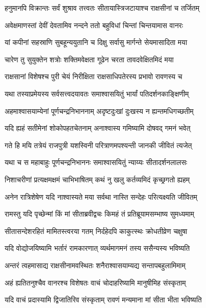 
\twolineshloka
{हनुमानपि विक्रान्तः सर्वं शुश्राव तत्त्वतः}
{सीतायास्त्रिजटायाश्च राक्षसीनां च तर्जितम्} %

\twolineshloka
{अवेक्षमाणस्तां देवीं देवतामिव नन्दने}
{ततो बहुविधां चिन्तां चिन्तयामास वानरः} %

\twolineshloka
{यां कपीनां सहस्राणि सुबहून्ययुतानि च}
{दिक्षु सर्वासु मार्गन्ते सेयमासादिता मया} %

\twolineshloka
{चारेण तु सुयुक्तेन शत्रोः शक्तिमवेक्षता}
{गूढेन चरता तावदवेक्षितमिदं मया} %

\twolineshloka
{राक्षसानां विशेषश्च पुरी चेयं निरीक्षिता}
{राक्षसाधिपतेरस्य प्रभावो रावणस्य च} %

\twolineshloka
{यथा तस्याप्रमेयस्य सर्वसत्त्वदयावतः}
{समाश्वासयितुं भार्यां पतिदर्शनकाङ्क्षिणीम्} %

\twolineshloka
{अहमाश्वासयाम्येनां पूर्णचन्द्रनिभाननाम्}
{अदृष्टदुःखां दुःखस्य न ह्यन्तमधिगच्छतीम्} %

\twolineshloka
{यदि ह्यहं सतीमेनां शोकोपहतचेतनाम्}
{अनाश्वास्य गमिष्यामि दोषवद् गमनं भवेत्} %

\twolineshloka
{गते हि मयि तत्रेयं राजपुत्री यशस्विनी}
{परित्राणमपश्यन्ती जानकी जीवितं त्यजेत्} %

\twolineshloka
{यथा च स महाबाहुः पूर्णचन्द्रनिभाननः}
{समाश्वासयितुं न्याय्यः सीतादर्शनलालसः} %

\twolineshloka
{निशाचरीणां प्रत्यक्षमक्षमं चाभिभाषितम्}
{कथं नु खलु कर्तव्यमिदं कृच्छ्रगतो ह्यहम्} %

\twolineshloka
{अनेन रात्रिशेषेण यदि नाश्वास्यते मया}
{सर्वथा नास्ति सन्देहः परित्यक्ष्यति जीवितम्} %

\twolineshloka
{रामस्तु यदि पृच्छेन्मां किं मां सीताब्रवीद्वचः}
{किमहं तं प्रतिब्रूयामसम्भाष्य सुमध्यमाम्} %

\twolineshloka
{सीतासन्देशरहितं मामितस्त्वरया गतम्}
{निर्दहेदपि काकुत्स्थः क्रोधतीव्रेण चक्षुषा} %

\twolineshloka
{यदि वोद्योजयिष्यामि भर्तारं रामकारणात्}
{व्यर्थमागमनं तस्य ससैन्यस्य भविष्यति} %

\twolineshloka
{अन्तरं त्वहमासाद्य राक्षसीनामवस्थितः}
{शनैराश्वासयाम्यद्य सन्तापबहुलामिमाम्} %

\twolineshloka
{अहं ह्यतितनुश्चैव वानरश्च विशेषतः}
{वाचं चोदाहरिष्यामि मानुषीमिह संस्कृताम्} %

\twolineshloka
{यदि वाचं प्रदास्यामि द्विजातिरिव संस्कृताम्}
{रावणं मन्यमाना मां सीता भीता भविष्यति} %

